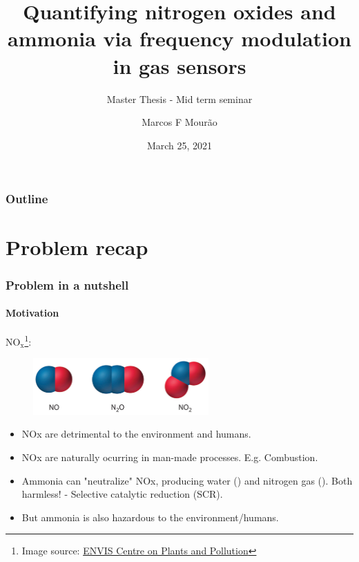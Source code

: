 \documentclass{beamer}
\title{Quantifying nitrogen oxides and ammonia via frequency modulation in gas sensors}
\subtitle{Master Thesis - Mid term seminar}
\author{Marcos F Mourão}
\date{March 25, 2021}
\begin{document}
	\begin{frame}
		\titlepage
	\end{frame}

\begin{frame}
	\frametitle{Outline}
	\tableofcontents
\end{frame}


\section{Problem recap}
\begin{frame}
	\frametitle{Problem in a nutshell}
	\framesubtitle{Motivation}
	$\text{NO}_{\text{x}}$\footnote{Image source: \href{http://www.nbrienvis.nic.in/Database/1_2039.aspx}{ENVIS Centre on Plants and Pollution}}:
	\begin{figure}[!htb]
		\centering
		\includegraphics[width=0.6\textwidth]{../../figures/nox-molecules.jpg}
	\end{figure} 

	\pause
	\begin{itemize}
		\item NOx are detrimental to the environment and humans.
		\pause
		
		\item NOx are naturally ocurring in man-made processes. E.g. Combustion.
		\pause
		
		\item Ammonia can "neutralize" NOx, producing water () and nitrogen gas (). Both harmless! - Selective catalytic reduction (SCR).
		\pause
		
		\item But ammonia is also hazardous to the environment/humans.
	\end{itemize}
	
\end{frame}
\end{document}
